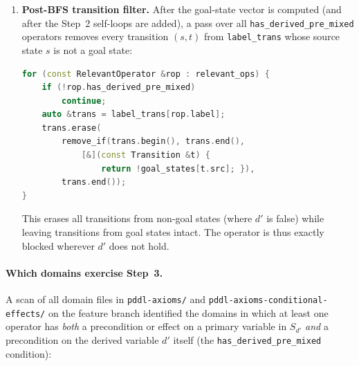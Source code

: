 \documentclass[11pt,a4paper]{article}
\begin{document}
\begin{itemize}
\begin{enumerate}
      \item \textbf{Post-BFS transition filter.}
        After the goal-state vector is computed (and after the Step~2
        self-loops are added), a pass over all
        \texttt{has\_derived\_pre\_mixed} operators removes every transition
        $(s, t)$ from \texttt{label\_trans} whose source state $s$ is not a
        goal state:
\begin{lstlisting}[language=C++]
for (const RelevantOperator &rop : relevant_ops) {
    if (!rop.has_derived_pre_mixed)
        continue;
    auto &trans = label_trans[rop.label];
    trans.erase(
        remove_if(trans.begin(), trans.end(),
            [&](const Transition &t) {
                return !goal_states[t.src]; }),
        trans.end());
}
\end{lstlisting}
        This erases all transitions from non-goal states (where $d'$ is
        false) while leaving transitions from goal states intact.  The
        operator is thus exactly blocked wherever $d'$ does not hold.
    \end{enumerate}

    \paragraph{Which domains exercise Step~3.}

    A scan of all domain files in \texttt{pddl-axioms/} and
    \texttt{pddl-axioms-conditional-effects/} on the feature branch
    identified the domains in which at least one operator has \emph{both}
    a precondition or effect on a primary variable in $S_{d'}$ \emph{and}
    a precondition on the derived variable $d'$ itself (the
    \texttt{has\_derived\_pre\_mixed} condition):


\end{itemize}
\end{document}
